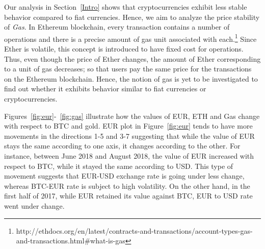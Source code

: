  \par
Our analysis in Section~\ref{Intro} shows that cryptocurrencies exhibit less stable behavior compared to fiat currencies. Hence, we aim to analyze the price stability of \emph{Gas}. In Ethereum blockchain, every transaction contains a number of operations and there is a precise amount of gas unit associated with each.\footnote{http://ethdocs.org/en/latest/contracts-and-transactions/account-types-gas-and-transactions.html\#what-is-gas} Since Ether is volatile, this concept is introduced to have fixed cost for operations. Thus, even though the price of Ether changes, the amount of Ether corresponding to a unit of gas decreases; so that users pay the same price for the transactions on the Ethereum blockchain. Hence, the notion of gas is yet to be investigated to find out whether it exhibits behavior similar to fiat currencies or cryptocurrencies.






Figures~\ref{fig:eur}-~\ref{fig:gas} illustrate how the values of EUR, ETH and Gas change with respect to BTC and gold. EUR plot in Figure~\ref{fig:eur} tends to have more movements in the directions 1-5 and 3-7 suggesting that while the value of EUR stays the same according to one axis, it changes according to the other. For instance, between June 2018 and August 2018, the value of EUR increased with respect to BTC, while it stayed the same according to USD. This type of movement suggests that EUR-USD exchange rate is going under less change, whereas BTC-EUR rate is subject to high volatility. On the other hand, in the first half of 2017, while EUR retained its value against BTC, EUR to USD rate went under change.


